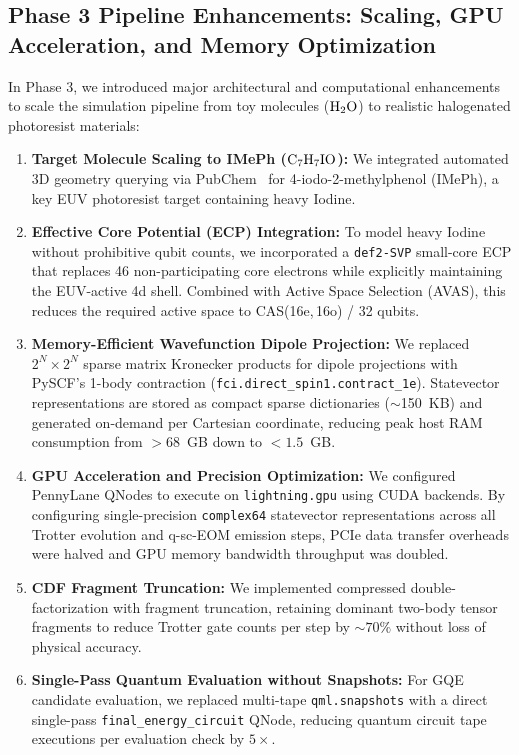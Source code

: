 \documentclass[11pt]{article}
\begin{document}
\subsection{Phase 3 Pipeline Enhancements: Scaling, GPU Acceleration, and Memory Optimization}
In Phase 3, we introduced major architectural and computational enhancements to scale the simulation pipeline from toy molecules ($\rm H_2O$) to realistic halogenated photoresist materials:
\begin{enumerate}[leftmargin=*,noitemsep,topsep=0pt]
  \item \textbf{Target Molecule Scaling to IMePh ($\rm C_7H_7IO$):} We integrated automated 3D geometry querying via PubChem~\cite{pubchem2021} for 4-iodo-2-methylphenol (IMePh), a key EUV photoresist target containing heavy Iodine.
  \item \textbf{Effective Core Potential (ECP) Integration:} To model heavy Iodine without prohibitive qubit counts, we incorporated a \texttt{def2-SVP} small-core ECP that replaces 46 non-participating core electrons while explicitly maintaining the EUV-active 4d shell. Combined with Active Space Selection (AVAS), this reduces the required active space to CAS(16e,\,16o) / 32 qubits.
  \item \textbf{Memory-Efficient Wavefunction Dipole Projection:} We replaced $2^N \times 2^N$ sparse matrix Kronecker products for dipole projections with PySCF's 1-body contraction (\texttt{fci.direct\_spin1.contract\_1e}). Statevector representations are stored as compact sparse dictionaries ($\sim$150~KB) and generated on-demand per Cartesian coordinate, reducing peak host RAM consumption from $>68$~GB down to $<1.5$~GB.
  \item \textbf{GPU Acceleration and Precision Optimization:} We configured PennyLane QNodes to execute on \texttt{lightning.gpu} using CUDA backends. By configuring single-precision \texttt{complex64} statevector representations across all Trotter evolution and q-sc-EOM emission steps, PCIe data transfer overheads were halved and GPU memory bandwidth throughput was doubled.
  \item \textbf{CDF Fragment Truncation:} We implemented compressed double-factorization with fragment truncation, retaining dominant two-body tensor fragments to reduce Trotter gate counts per step by $\sim 70\%$ without loss of physical accuracy.
  \item \textbf{Single-Pass Quantum Evaluation without Snapshots:} For GQE candidate evaluation, we replaced multi-tape \texttt{qml.snapshots} with a direct single-pass \texttt{final\_energy\_circuit} QNode, reducing quantum circuit tape executions per evaluation check by $5\times$.
\end{enumerate}
\end{document}
